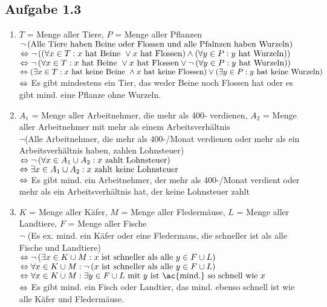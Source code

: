 \subsection{Aufgabe 1.3}
\begin{enumerate}[label=\alph*)]
\item $T$ = Menge aller Tiere, $P$ = Menge aller Pflanzen\\
	$\neg\left(\text{Alle Tiere haben Beine oder Flossen und alle Pfalnzen haben Wurzeln}\right)$\\
	$\Leftrightarrow \neg\left(\left(\forall x \in T: x \text{ hat Beine } \vee x \text{ hat Flossen}\right) \wedge \left(\forall y \in P: y \text{ hat Wurzeln}\right)\right)$\\
	$\Leftrightarrow \neg\left(\forall x \in T: x \text{ hat Beine } \vee x \text{ hat Flossen} \vee \neg\left(\forall y \in P: y \text{ hat Wurzeln}\right)\right)$\\
	$\Leftrightarrow \left(\exists x \in T: x \text{ hat keine Beine } \wedge x \text{ hat keine Flossen}\right) \vee \left(\exists y \in P: y \text{ hat keine Wurzeln}\right)$\\
	$\Leftrightarrow$ Es gibt mindestens ein Tier, das weder Beine noch Flossen hat oder es gibt \ac{mind.} eine Pflanze ohne Wurzeln.

\item $A_1$ = Menge aller Arbeitnehmer, die mehr als 400- verdienen, $A_2$ = Menge aller Arbeitnehmer mit mehr als einem Arbeitsverhältnis\\
	$\neg$(Alle Arbeitnehmer, die mehr als 400-/Monat verdienen oder mehr als ein Arbeitsverhältnis haben, zahlen Lohnsteuer)\\
	$\Leftrightarrow \neg\left(\forall x \in A_1 \cup A_2: x \text{ zahlt Lohnsteuer}\right)$\\
	$\Leftrightarrow \exists x \in A_1 \cup A_2: x \text{ zahlt keine Lohnsteuer}$\\
	$\Leftrightarrow$ Es gibt \ac{mind.} ein Arbeitnehmer, der mehr als 400-/Monat verdient oder mehr als ein Arbeitsverhältnis hat, der keine Lohnsteuer zahlt

\item $K$ = Menge aller Käfer, $M$ = Menge aller Fledermäuse, $L$ = Menge aller Landtiere, $F$ = Menge aller Fische\\
	$\neg$ (Es \ac{ex.} \ac{mind.} ein Käfer oder eine Fledermaus, die schneller ist als alle Fische und Landtiere)\\
	$\Leftrightarrow \neg\left(\exists x \in K \cup M: x \text{ ist schneller als alle } y \in F \cup L\right)$\\
	$\Leftrightarrow \forall x \in K \cup M: \neg\left(x \text{ ist schneller als alle } y \in F \cup L\right)$\\
	$\Lra \forall x \in K \cup M: \exists y \in F \cup L \tx{ mit } y \tx{ ist \ac{mind.} so schnell wie } x$\\
	$\Leftrightarrow$ Es gibt \ac{mind.} ein Fisch oder Landtier, das \ac{mind.} ebenso schnell ist wie alle Käfer und Fledermäuse.
\end{enumerate}

